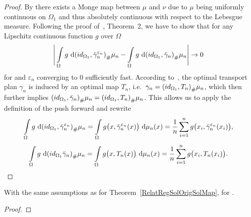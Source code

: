 \begin{proof}
	By  there exists a Monge map between $\mu$ and $\nu$ due to $\mu$ being uniformly continuous on $\Omega_1$ and thus absolutely continuous with respect to the Lebesgue measure. Following the proof of~\cite{Seg2018}, Theorem~2, we have to show that for any Lipschitz continuous function $g$ over $\Omega$
	\[ \Bigg\lvert \int\limits_{\Omega} g~\D[{\push[(id_{\Omega_1}, \bar{\gamma}_n^{\varepsilon_n})]{\mu_n}}] - \int\limits_{\Omega} g~\D[{\push[(id_{\Omega_1}, \bar{\gamma}_n)]{\mu_n}}] \Bigg\rvert \rightarrow 0 \]
	for \Ninf{} and $\varepsilon_n$ converging to $0$ sufficiently fast. According to~\cite{Seg2018}, the optimal transport plan $\gamma_n$ is induced by an optimal map $T_n$, i.e.~$\gamma_n = \push[(id_{\Omega_1}, T_n)]{\mu_n}$, which then further implies $\push[(id_{\Omega_1}, \bar{\gamma}_n)]{\mu_n} = \push[(id_{\Omega_1}, T_n)]{\mu_n}$. This allows us to apply the definition of the push forward and rewrite
	\[ \int\limits_{\Omega} g~\D[{\push[(id_{\Omega_1}, \bar{\gamma}_n^{\varepsilon_n})]{\mu_n}}] = \int\limits_{\Omega} g\big( x, \bar{\gamma}_n^{\varepsilon_n}(x) \big)~\Dx{\mu_n} = \frac{1}{n} \sum\limits_{i = 1}^n g\big( x_i, \bar{\gamma}_n^{\varepsilon_n}(x_i) \big), \]
	\[ \int\limits_{\Omega} g~\D[{\push[(id_{\Omega_1} \bar{\gamma}_n)]{\mu_n}}] = \int\limits_{\Omega} g\big( x, T_n(x) \big)~\Dx{\mu_n} = \frac{1}{n} \sum\limits_{i = 1}^n g\big( x_i, T_n(x_i) \big). \]
\end{proof}

\begin{corollary}\label{RelatRegOrigCor}
	With the same assumptions as for Theorem~\ref{RelatRegSolOrigSolMap},  for \Ninf.
\end{corollary}

\begin{proof}
\end{proof}